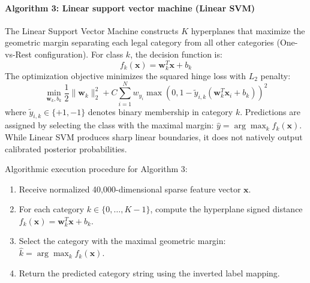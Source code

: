 \paragraph*{Algorithm 3: Linear support vector machine (Linear SVM)}
The Linear Support Vector Machine constructs $K$ hyperplanes that maximize the geometric margin separating each legal category from all other categories (One-vs-Rest configuration). For class $k$, the decision function is:
\begin{equation}
    f_k(\mathbf{x}) = \mathbf{w}_k^T \mathbf{x} + b_k
    \label{eq:svm_decision}
\end{equation}
The optimization objective minimizes the squared hinge loss with $L_2$ penalty:
\begin{equation}
    \min_{\mathbf{w}_k, b_k} \frac{1}{2} \|\mathbf{w}_k\|_2^2 + C \sum_{i=1}^{N} w_{y_i} \max\left(0, 1 - \tilde{y}_{i,k} (\mathbf{w}_k^T \mathbf{x}_i + b_k)\right)^2
    \label{eq:svm_loss}
\end{equation}
where $\tilde{y}_{i,k} \in \{+1, -1\}$ denotes binary membership in category $k$. Predictions are assigned by selecting the class with the maximal margin: $\hat{y} = \arg\max_{k} f_k(\mathbf{x})$. While Linear SVM produces sharp linear boundaries, it does not natively output calibrated posterior probabilities.

\noindent Algorithmic execution procedure for Algorithm 3:
\begin{enumerate}
    \item Receive normalized 40,000-dimensional sparse feature vector $\mathbf{x}$.
    \item For each category $k \in \{0, \dots, K-1\}$, compute the hyperplane signed distance $f_k(\mathbf{x}) = \mathbf{w}_k^T \mathbf{x} + b_k$.
    \item Select the category with the maximal geometric margin: $\hat{k} = \arg\max_k f_k(\mathbf{x})$.
    \item Return the predicted category string using the inverted label mapping.
\end{enumerate}

